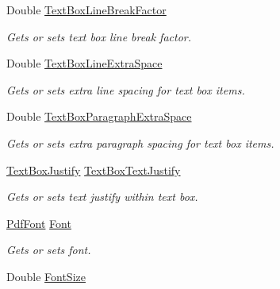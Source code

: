 \begin{DoxyCompactItemize}
Double \hyperlink{class_pdf_file_writer_1_1_pdf_table_style_a51f805784b73bd5de8012d6366d7c56b}{Text\+Box\+Line\+Break\+Factor}
\begin{DoxyCompactList}\small\item\em Gets or sets text box line break factor. \end{DoxyCompactList}\item 
Double \hyperlink{class_pdf_file_writer_1_1_pdf_table_style_a320b86209a5066dabf4e66c6448e00ee}{Text\+Box\+Line\+Extra\+Space}
\begin{DoxyCompactList}\small\item\em Gets or sets extra line spacing for text box items. \end{DoxyCompactList}\item 
Double \hyperlink{class_pdf_file_writer_1_1_pdf_table_style_a4ea60f87203491fc37c274bd3514432e}{Text\+Box\+Paragraph\+Extra\+Space}
\begin{DoxyCompactList}\small\item\em Gets or sets extra paragraph spacing for text box items. \end{DoxyCompactList}\item 
\hyperlink{namespace_pdf_file_writer_acc2474cdbd7c2cbc188a4a852e439459}{Text\+Box\+Justify} \hyperlink{class_pdf_file_writer_1_1_pdf_table_style_a7d586f9ce0d96760bdba635efc652647}{Text\+Box\+Text\+Justify}
\begin{DoxyCompactList}\small\item\em Gets or sets text justify within text box. \end{DoxyCompactList}\item 
\hyperlink{class_pdf_file_writer_1_1_pdf_font}{Pdf\+Font} \hyperlink{class_pdf_file_writer_1_1_pdf_table_style_a862b654b3ee257db021e515cc358739a}{Font}
\begin{DoxyCompactList}\small\item\em Gets or sets font. \end{DoxyCompactList}\item 
Double \hyperlink{class_pdf_file_writer_1_1_pdf_table_style_a2de92e201155939848ad867637afa08b}{Font\+Size}

\end{DoxyCompactItemize}
